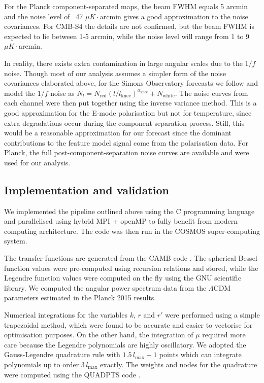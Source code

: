 For the Planck component-separated maps, the beam FWHM equals 5 arcmin and the noise level of ~47 $\mu K \cdot $arcmin gives a good approximation to the noise covariances. For CMB-S4 the details are not confirmed, but the beam FWHM is expected to lie between 1-5 arcmin, while the noise level will range from 1 to 9 $\mu K \cdot $arcmin. \cite{Abazajian2016}

In reality, there exists extra contamination in large angular scales due to the $1/f$ noise. Though most of our analysis assumes a simpler form of the noise covariances elaborated above, for the Simons Observatory forecasts we follow \cite{TheSimonsObservatoryCollaboration2018} and model the $1/f$ noise as \newline ${N_l = N_\text{red} (l/l_\text{knee})^{\alpha_\text{knee}} + N_\text{white}}$. The noise curves from each channel were then put together using the inverse variance method. This is a good approximation for the E-mode polarisation but not for temperature, since extra degradations occur during the component separation process. Still, this would be a reasonable approximation for our forecast since the dominant contributions to the feature model signal come from the polarisation data. For Planck, the full post-component-separation noise curves are available and were used for our analysis. 



\subsection{Implementation and validation}

We implemented the pipeline outlined above using the C programming language and parallelised using hybrid MPI + openMP to fully benefit from modern computing architecture. The code was then run in the COSMOS super-computing system.

The transfer functions are generated from the CAMB code \cite{Lewis2000}. The spherical Bessel function values were pre-computed using recursion relations and stored, while the Legendre function values were computed on the fly using the GNU scientific library. We computed the angular power spectrum data from the $\Lambda$CDM parameters estimated in the Planck 2015 results. 

Numerical integrations for the variables $k$, $r$ and $r'$ were performed using a simple trapezoidal method, which were found to be accurate and easier to vectorise for optimisation purposes. On the other hand, the integration of $\mu$ required more care because the Legendre polynomials are highly oscillatory. We adopted the Gauss-Legendre quadrature rule with $1.5 \,l_\text{max}+1$ points which can integrate polynomials up to order $3\,l_\text{max}$ exactly. The weights and nodes for the quadrature were computed using the QUADPTS code \cite{Hale2013}.

